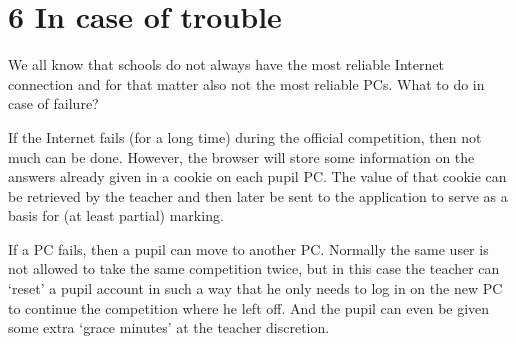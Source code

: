 \section*{6 In case of trouble}

We all know that schools do not always have the most reliable Internet connection and for that matter also not the most reliable PCs. What to do in case of failure?

If the Internet fails (for a long time) during the official competition, then not much can be done. However, the browser will store some information on the answers already given in a cookie on each pupil PC. The value of that cookie can be retrieved by the teacher and then later be sent to the application to serve as a basis for (at least partial) marking.

If a PC fails, then a pupil can move to another PC. Normally the same user is not allowed to take the same competition twice, but in this case the teacher can `reset' a pupil account in such a way that he only needs to log in on the new PC to continue the competition where he left off. And the pupil can even be given some extra `grace minutes' at the teacher discretion. 